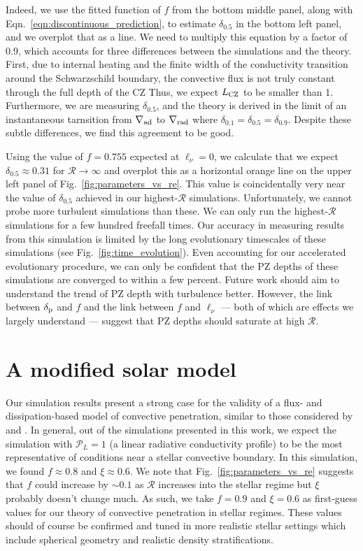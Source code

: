 \documentclass[twocolumn]{aastex631}
\newcommand{\gradrad}{\ensuremath{\nabla_{\rm{rad}}}}
\newcommand{\gradad}{\ensuremath{\nabla_{\rm{ad}}}}
\newcommand{\delp}{\ensuremath{\delta_{\rm{p}}}}
\newcommand{\mP}{\ensuremath{\mathcal{P}}}
\newcommand{\mR}{\ensuremath{\mathcal{R}}}
\begin{document}
Indeed, we use the fitted function of $f$ from the bottom middle panel, along with Eqn.~\ref{eqn:discontinuous_prediction}, to estimate $\delta_{0.5}$ in the bottom left panel, and we overplot that as a line.
We need to multiply this equation by a factor of 0.9, which accounts for three differences between the simulations and the theory.
First, due to internal heating and the finite width of the conductivity transition around the Schwarzschild boundary, the convective flux is not truly constant through the full depth of the CZ
Thus, we expect $L_{\rm{CZ}}$ to be smaller than 1.
Furthermore, we are measuring $\delta_0.5$, and the theory is derived in the limit of an instantaneous tarnsition from $\gradad$ to $\gradrad$ where $\delta_{0.1} = \delta_{0.5} = \delta_{0.9}$.
Despite these subtle differences, we find this agreement to be good.

Using the value of $f = 0.755$ expected at $\ell_\nu = 0$, we calculate that we expect $\delta_{0.5} \approx 0.31$ for $\mR \rightarrow \infty$ and overplot this as a horizontal orange line on the upper left panel of Fig.~\ref{fig:parameters_vs_re}.
This value is coincidentally very near the value of $\delta_{0.5}$ achieved in our highest-$\mR$ simulations.
Unfortunately, we cannot probe more turbulent simulations than these.
We can only run the highest-$\mR$ simulations for a few hundred freefall times.
Our accuracy in measuring results from this simulation is limited by the long evolutionary timescales of these simulations (see Fig.~\ref{fig:time_evolution}).
Even accounting for our accelerated evolutionary procedure, we can only be confident that the PZ depths of these simulations are converged to within a few percent.
Future work should aim to understand the trend of PZ depth with turbulence better.
However, the link between $\delp$ and $f$ and the link between $f$ and $\ell_\nu$ --- both of which are effects we largely understand --- suggest that PZ depths should saturate at high $\mR$.




\section{A modified solar model}
\label{sec:solar_model}
Our simulation results present a strong case for the validity of a flux- and dissipation-based model of convective penetration, similar to those considered by \citet{zahn1991} and \citet{roxburgh1989}.
In general, out of the simulations presented in this work, we expect the simulation with $\mP_L = 1$ (a linear radiative conductivity profile) to be the most representative of conditions near a stellar convective boundary.
In this simulation, we found $f \approx 0.8$ and $\xi \approx 0.6$.
We note that Fig.~\ref{fig:parameters_vs_re} suggests that $f$ could increase by $\sim 0.1$ as $\mR$ increases into the stellar regime but $\xi$ probably doesn't change much.
As such, we take $f = 0.9$ and $\xi = 0.6$ as first-guess values for our theory of convective penetration in stellar regimes.
These values should of course be confirmed and tuned in more realistic stellar settings which include spherical geometry and realistic density stratifications.
\end{document}
